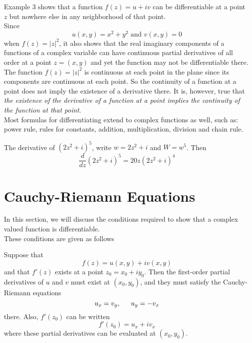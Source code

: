 Example 3 shows that a function $ f(z) = u + iv $ can be differentiable at a point $ z $ but nowhere else in any neighborhood of that point. \\
Since 
\[ u(x,y) = x^2 + y^2 \text{ and } v(x,y)=0\]
when $ f(z) = |z|^2 $, it also shows that the real imaginary components of a functions of a complex variable can have continuous partial derivatives of all order at a point $ z = (x,y) $ and yet the function may not be differentiable there. \\
The function $ f(z) = |z|^2 $ is continuous at each point in the plane since its components are continuous at each point. So the continuity of a function at a point does not imply the existence of a derivative there. It is, however, true that \textit{the existence of the derivative of a function at a point implies the continuity of the function at that point}. \\
Most formulas for differentiating extend to complex functions as well, such as: power rule, rules for constants, addition, multiplication, division and chain rule. 
\begin{example}
	The derivative of $ (2z^2 + i)^5 $, write $ w = 2z^2 + i $ and $ W = w^5 $. Then 
	\[ \dfrac{d}{dz} (2z^2 + i)^5 = 20z(2z^2 + i)^4 \]
\end{example}

\section{Cauchy-Riemann Equations}
In this section, we will discuss the conditions required to show that a complex valued function is differentiable. \\ These conditions are given as follows 
\begin{theorem}
	Suppose that \[ f(z) = u(x,y) + iv(x,y) \] and that $ f'(z) $ exists at a point $ z_0 = x_0 + iy_0 $. Then the first-order partial derivatives of $ u $ and $ v $ must exist at $ (x_0, y_0) $, and they must satisfy the Cauchy-Riemann equations 
	\[ u_x = v_y, \indent u_y = -v_x \]
	there. Also, $ f'(z_0) $ can be written 
	\[ f'(z_0) = u_x + i v_x \] 
	where these partial derivatives can be evaluated at $ (x_0, y_0) $.
\end{theorem} 

